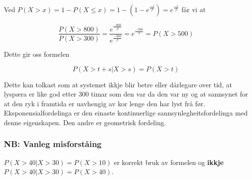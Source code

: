 Ved $P(X > x) = 1 - P(X \leq x) = 1 - (1 - e^\frac{-x}{\beta}) = e^\frac{-x}{\beta}$ får vi at

\begin{equation}
    \frac{P(X > 800)}{P(X > 300)} = \frac{e^\frac{-800}{\beta}}{e^\frac{-300}{\beta}} = e^\frac{-500}{\beta} = P(X > 500)
\end{equation}

Dette gir oss formelen

\begin{equation}
    P(X > t + s | X > s) = P(X > t)
\end{equation}

Dette kan tolkast som at systemet ikkje blir betre eller dårlegare over tid, at lyspæra er like god etter 300 timar som den var da den var ny og at sannsynet for at den ryk i framtida er uavhengig av kor lenge den har lyst frå før. Eksponensialfordelinga er den einaste kontinuerlige sannsynlegheitsfordelinga med denne eigenskapen. Den andre er geometrisk fordeling. 

\subsubsection{NB: Vanleg misforståing}
$P(X > 40 | X > 30) = P(X > 10)$ er korrekt bruk av formelen og \textbf{ikkje}
$P(X > 40 | X > 30) = P(X > 40)$. 